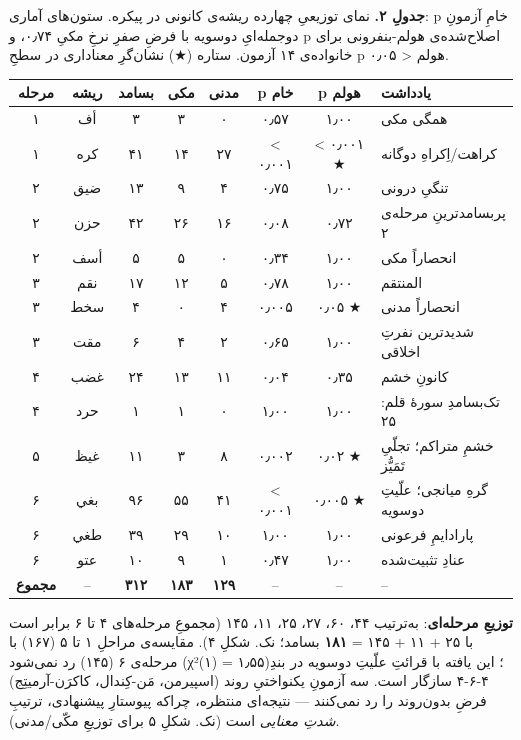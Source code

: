 \documentclass[12pt,a4paper]{article}
\begin{document}
\begin{RTL}
\begin{otherlanguage}{persian}
\textbf{جدولِ ۲.} نمای توزیعیِ چهارده ریشه‌ی کانونی در پیکره. ستون‌های
آماری: p خامِ آزمونِ دوجمله‌ایِ دوسویه با فرضِ صفرِ نرخِ مکیِ ۰٫۷۴، و p
اصلاح‌شده‌ی هولم-بنفرونی برای خانواده‌ی ۱۴ آزمون. ستاره (★) نشان‌گرِ معناداری
در سطحِ p هولم \textless{} ۰٫۰۵.

\begin{longtable}[]{@{}cccccccl@{}}
\toprule\noalign{}
مرحله & ریشه & بسامد & مکی & مدنی & p خام & p هولم & یادداشت \\
\midrule\noalign{}
\endhead
\bottomrule\noalign{}
\endlastfoot
۱ & أف & ۳ & ۳ & ۰ & ۰٫۵۷ & ۱٫۰۰ & همگی مکی \\
۱ & کره & ۴۱ & ۱۴ & ۲۷ & \textless{} ۰٫۰۰۱ & \textless{} ۰٫۰۰۱ ★ &
کراهت/اِکراهِ دوگانه \\
۲ & ضيق & ۱۳ & ۹ & ۴ & ۰٫۷۵ & ۱٫۰۰ & تنگیِ درونی \\
۲ & حزن & ۴۲ & ۲۶ & ۱۶ & ۰٫۰۸ & ۰٫۷۲ & پربسامدترینِ مرحله‌ی ۲ \\
۲ & أسف & ۵ & ۵ & ۰ & ۰٫۳۴ & ۱٫۰۰ & انحصاراً مکی \\
۳ & نقم & ۱۷ & ۱۲ & ۵ & ۰٫۷۸ & ۱٫۰۰ & المنتقم \\
۳ & سخط & ۴ & ۰ & ۴ & ۰٫۰۰۵ & ۰٫۰۵ ★ & انحصاراً مدنی \\
۳ & مقت & ۶ & ۴ & ۲ & ۰٫۶۵ & ۱٫۰۰ & شدیدترین نفرتِ اخلاقی \\
۴ & غضب & ۲۴ & ۱۳ & ۱۱ & ۰٫۰۴ & ۰٫۳۵ & کانونِ خشم \\
۴ & حرد & ۱ & ۱ & ۰ & ۱٫۰۰ & ۱٫۰۰ & تک‌بسامدِ سورۀ قلم: ۲۵ \\
۵ & غيظ & ۱۱ & ۳ & ۸ & ۰٫۰۰۲ & ۰٫۰۲ ★ & خشمِ متراکم؛ تجلّیِ تَمَیُّز \\
۶ & بغي & ۹۶ & ۵۵ & ۴۱ & \textless{} ۰٫۰۰۱ & ۰٫۰۰۵ ★ & گرهِ میانجی؛ علّیتِ
دوسویه \\
۶ & طغي & ۳۹ & ۲۹ & ۱۰ & ۱٫۰۰ & ۱٫۰۰ & پارادایمِ فرعونی \\
۶ & عتو & ۱۰ & ۹ & ۱ & ۰٫۴۷ & ۱٫۰۰ & عنادِ تثبیت‌شده \\
\textbf{مجموع} & -- & \textbf{۳۱۲} & \textbf{۱۸۳} & \textbf{۱۲۹} & -- &
-- & -- \\
\end{longtable}

\textbf{توزیعِ مرحله‌ای}: به‌ترتیب ۴۴، ۶۰، ۲۷، ۲۵، ۱۱، ۱۴۵ (مجموعِ مرحله‌های
۴ تا ۶ برابر است با ۲۵ + ۱۱ + ۱۴۵ = \textbf{۱۸۱} بسامد؛ نک. شکلِ ۴).
مقایسه‌ی مراحلِ ۱ تا ۵ (۱۶۷) با مرحله‌ی ۶ (۱۴۵) رد نمی‌شود (χ²(۱) = ۱٫۵۵)؛
این یافته با قرائتِ علّیتِ دوسویه در بندِ ۴-۶-۴ سازگار است. سه آزمونِ
یکنواختیِ روند (اسپیرمن، مَن-کِندال، کاکرَن-آرمیتِج) فرضِ بدون‌روند را رد
نمی‌کنند --- نتیجه‌ای منتظره، چراکه پیوستارِ پیشنهادی، ترتیبِ \emph{شدتِ
معنایی} است (نک. شکلِ ۵ برای توزیعِ مکّی/مدنی).


\end{otherlanguage}
\end{RTL}
\end{document}
